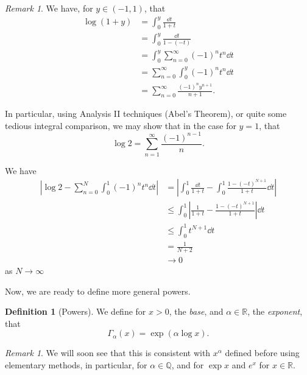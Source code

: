 \documentclass[11pt]{article}
\numberwithin{equation}{section}
\theoremstyle{definition}
\newtheorem{definition}[theorem]{Definition}
\theoremstyle{remark}
\newtheorem{remark}[theorem]{Remark}
\newcommand{\pqty}[1]{\left(#1\right)}
\newcommand{\abs}[1]{\left|#1\right|}
\newcommand{\oointv}[2]{(#1,#2)}
\newcommand{\RR}{\mathbb R}
\newcommand{\QQ}{\mathbb Q}
\begin{document}
\begin{remark}\label{analysis-unit-0223}
    We have, for \(y \in \oointv{-1}{1}\), that
    \begin{align*}
        \log\pqty{1 + y} &= \int_0^y \frac{\dd{t}}{1 + t} \\
        &= \int_0^y \frac{\dd{t}}{1 - \pqty{-t}} \\
        &= \int_0^y \sum_{n = 0}^{\infty} \pqty{-1}^n t^n \dd{t} \\
        &= \sum_{n = 0}^{\infty} \int_0^y \pqty{-1}^n t^n \dd{t} \\
        &= \sum_{n = 0}^{\infty} \frac{\pqty{-1}^{n} y^{n + 1}}{n + 1}.
    \end{align*}

    In particular, using Analysis II techniques (Abel's Theorem), or quite some tedious integral comparison, we may show that in the case for \(y = 1\), that
    \[
        \log 2 = \sum_{n = 1}^{\infty} \frac{\pqty{-1}^{n - 1}}{n}.
    \]

    We have
    \begin{align*}
        \abs{\log 2 - \sum_{n = 0}^{N} \int_{0}^{1} \pqty{-1}^n t^n \dd{t}} &= \abs{\int_{0}^{1} \frac{\dd{t}}{1 + t} - \int_{0}^{1} \frac{1 - \pqty{-t}^{N + 1}}{1 + t} \dd{t}} \\
        &\leq \int_{0}^{1} \abs{\frac{1}{1 + t} - \frac{1 - \pqty{-t}^{N + 1}}{1 + t}} \dd{t} \\
        &\leq \int_{0}^{1} t^{N + 1} \dd{t} \\
        &= \frac{1}{N + 2} \\
        &\to 0
    \end{align*}
    as \(N \to \infty\)
\end{remark}

Now, we are ready to define more general powers.

\begin{definition}[Powers]\label{analysis-unit-0224}
    \label{def:general-powers}%
    We define for \(x > 0\), the \emph{base}, and \(\alpha \in \RR\), the \emph{exponent}, that
    \[
        \Gamma_{\alpha} \pqty{x} = \exp \pqty{\alpha \log x}.
    \]
\end{definition}

\begin{remark}\label{analysis-unit-0225}
    We will soon see that this is consistent with \(x^\alpha\) defined before using elementary methods, in particular, for \(\alpha \in \QQ\), and for \(\exp x\) and \(e^x\) for \(x \in \RR\).
\end{remark}
\end{document}

